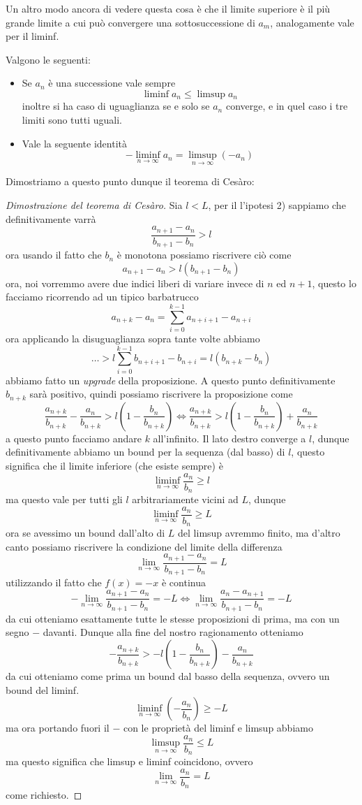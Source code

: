 \documentclass[11pt]{scrartcl}
\begin{document}
  Un altro modo ancora di vedere questa cosa è che il limite superiore è il più grande limite a cui può convergere una sottosuccessione di $a_m$, analogamente vale per il liminf.
  \begin{lemma}
  	Valgono le seguenti:
  	\begin{itemize}
  		\item Se $a_n$ è una successione vale sempre
  		$$\liminf a_n \le \limsup a_n$$
  		inoltre si ha caso di uguaglianza se e solo se $a_n$ converge, e in quel caso i tre limiti sono tutti uguali.
  		\item Vale la seguente identità
  		$$-\liminf_{n\to\infty} a_n =\limsup_{n\to\infty} (-a_n)$$
  	\end{itemize}
  \end{lemma}
  Dimostriamo a questo punto dunque il teorema di Cesàro:
  \begin{proof}[Dimostrazione del teorema di Cesàro]
  	Sia $l<L$, per il l'ipotesi 2) sappiamo che definitivamente varrà
  	$$\frac{a_{n+1}-a_n}{b_{n+1}-b_n}>l$$
  	ora usando il fatto che $b_n$ è monotona possiamo riscrivere ciò come
  	$$a_{n+1}-a_n>l(b_{n+1}-b_n)$$
  	ora, noi vorremmo avere due indici liberi di variare invece di $n$ ed $n+1$, questo lo facciamo ricorrendo ad un tipico barbatrucco
  	$$a_{n+k}-a_n=\sum_{i=0}^{k-1}a_{n+i+1}-a_{n+i}$$
  	ora applicando la disuguaglianza sopra tante volte abbiamo
  	$$\dots > l\sum_{i=0}^{k-1}b_{n+i+1}-b_{n+i}=l(b_{n+k}-b_n)$$
  	abbiamo fatto un \textit{upgrade} della proposizione. A questo punto definitivamente $b_{n+k}$ sarà positivo, quindi possiamo riscrivere la proposizione come
  	$$\frac{a_{n+k}}{b_{n+k}}-\frac{a_n}{b_{n+k}}>l\left(1-\frac{b_n}{b_{n+k}}\right)\iff \frac{a_{n+k}}{b_{n+k}}>l\left(1-\frac{b_n}{b_{n+k}}\right)+\frac{a_n}{b_{n+k}}$$
  	a questo punto facciamo andare $k$ all'infinito. Il lato destro converge a $l$, dunque definitivamente abbiamo un bound per la sequenza (dal basso) di $l$, questo significa che il limite inferiore (che esiste sempre) è
  	$$\liminf_{n\to\infty}\frac{a_n}{b_n}\ge l$$
  	ma questo vale per tutti gli $l$ arbitrariamente vicini ad $L$, dunque
  	$$\liminf_{n\to\infty}\frac{a_n}{b_n}\ge L$$
  	ora se avessimo un bound dall'alto di $L$ del limsup avremmo finito, ma d'altro canto possiamo riscrivere la condizione del limite della differenza
  	$$\lim_{n\to\infty}\frac{a_{n+1}-a_n}{b_{n+1}-b_n}=L$$
  	utilizzando il fatto che $f(x)=-x$ è continua
  	$$-\lim_{n\to\infty}\frac{a_{n+1}-a_{n}}{b_{n+1}-b_{n}}=-L \iff \lim_{n\to\infty}\frac{a_{n}-a_{n+1}}{b_{n+1}-b_{n}}=-L$$
  	da cui otteniamo esattamente tutte le stesse proposizioni di prima, ma con un segno $-$ davanti. Dunque alla fine del nostro ragionamento otteniamo
  	$$-\frac{a_{n+k}}{b_{n+k}}>-l\left(1-\frac{b_n}{b_{n+k}}\right)-\frac{a_n}{b_{n+k}}$$ 
  	da cui otteniamo come prima un bound dal basso della sequenza, ovvero un bound del liminf.
  	$$\liminf_{n\to\infty}\left(-\frac{a_{n}}{b_{n}}\right)\ge -L$$
  	ma ora portando fuori il $-$ con le proprietà del liminf e limsup abbiamo
  	$$\limsup_{n\to\infty}\frac{a_n}{b_n}\le L$$
  	ma questo significa che limsup e liminf coincidono, ovvero 
  	$$\lim_{n\to\infty}\frac{a_n}{b_n}=L$$
  	come richiesto.
  \end{proof}
\end{document}
